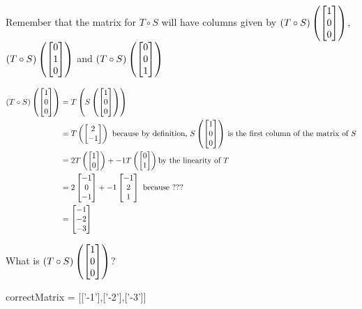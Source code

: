 \documentclass{ximera}
\begin{document}
\begin{question}
\begin{solution}
\begin{hint}
	Remember that the matrix for $T \circ S$ will have columns given by $(T \circ S)\left(\begin{bmatrix}1\\0\\0\end{bmatrix}\right)$,  $(T \circ S)\left(\begin{bmatrix}0\\1\\0\end{bmatrix}\right)$ and 
	$(T \circ S)\left(\begin{bmatrix}0\\0\\1\end{bmatrix}\right)$
\end{hint}
\begin{hint}
	\begin{question}
		\begin{solution}
		\begin{hint}
			\begin{align*}
				(T \circ S)\left(\begin{bmatrix}1\\0\\0\end{bmatrix}\right) &= T\left(S\left(\begin{bmatrix}1\\0\\0\end{bmatrix}\right)\right)\\
				&= T\left(\begin{bmatrix}2\\-1\end{bmatrix}\right) \text{ because by definition, $S\left(\begin{bmatrix}1\\0\\0\end{bmatrix}\right)$ is the first column of the matrix of $S$}\\
				&=2T\left(\begin{bmatrix}1\\0\end{bmatrix}\right) +-1 T\left(\begin{bmatrix}0\\1\end{bmatrix}\right) \text{by the linearity of $T$}\\
				&=2\begin{bmatrix}-1\\0\\-1\end{bmatrix}+-1\begin{bmatrix}-1\\2\\1\end{bmatrix} \text{ because ???}\\
				&=\begin{bmatrix}-1\\-2\\-3\end{bmatrix}
			\end{align*}
		\end{hint}
		What is  $(T \circ S)\left(\begin{bmatrix}1\\0\\0\end{bmatrix}\right)$?
			\begin{matrix-answer}[name=M]
 			   correctMatrix = [['-1'],['-2'],['-3']]
 			 \end{matrix-answer}
		\end{solution}
		

\end{question}
\end{hint}
\end{solution}
\end{question}
\end{document}
